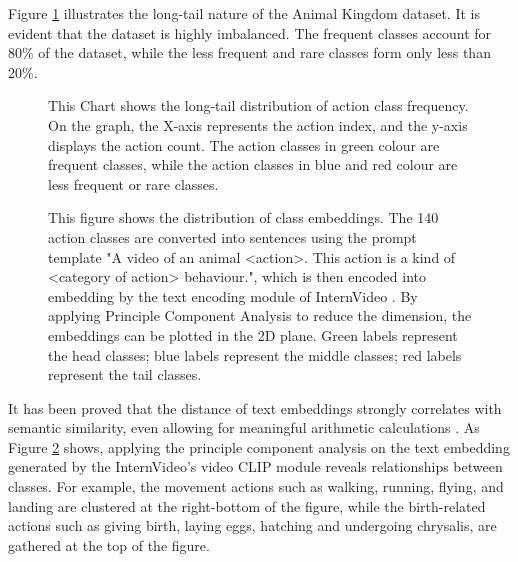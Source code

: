 Figure \ref{fig:1_1_LongTail} illustrates the long-tail nature of the Animal Kingdom dataset. It is evident that the dataset is highly imbalanced. The frequent classes account for 80\% of the dataset, while the less frequent and rare classes form only less than 20\%.

\begin{figure}[ht]
    \centering
    \resizebox{1.0\textwidth}{!}{}
    \caption[Action Classes Frequency Distribution]{This Chart shows the long-tail distribution of action class frequency. On the graph, the X-axis represents the action index, and the y-axis displays the action count. The action classes in green colour are frequent classes, while the action classes in blue and red colour are less frequent or rare classes.}
    \label{fig:1_1_LongTail}
\end{figure}

\begin{figure}[ht]
    \centering
    \caption[Class Embedding Distribution]{This figure shows the distribution of class embeddings. The 140 action classes are converted into sentences using the prompt template "A video of an animal <action>. This action is a kind of <category of action> behaviour.", which is then encoded into embedding by the text encoding module of InternVideo \parencite{wang2022internvideo}. By applying Principle Component Analysis to reduce the dimension, the embeddings can be plotted in the 2D plane. Green labels represent the head classes; blue labels represent the middle classes; red labels represent the tail classes.}
    \label{fig:1_2_ClassEmbeddingInternVideo}
\end{figure}

It has been proved that the distance of text embeddings strongly correlates with semantic similarity, even allowing for meaningful arithmetic calculations \parencite{mikolov2013efficient}. As Figure \ref{fig:1_2_ClassEmbeddingInternVideo} shows, applying the principle component analysis on the text embedding generated by the InternVideo's \parencite{wang2022internvideo} video CLIP module reveals relationships between classes. For example, the movement actions such as walking, running, flying, and landing are clustered at the right-bottom of the figure, while the birth-related actions such as giving birth, laying eggs, hatching and undergoing chrysalis, are gathered at the top of the figure. 

